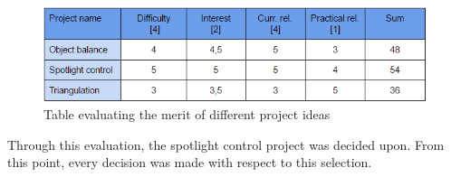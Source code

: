 \begin{figure}[h!]
\centering
\includegraphics[scale=0.9]{Billeder/IDEA_WEIGHT.png}
\caption{Table evaluating the merit of different project ideas}
\label{fig:ProjectEvaluation}
\end{figure}

Through this evaluation, the spotlight control project was decided upon. From this point, every decision was made with respect to this selection.